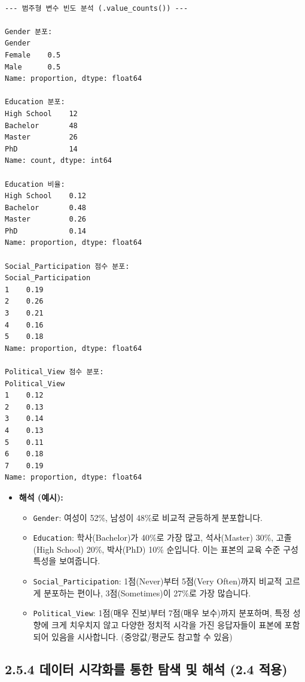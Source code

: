 \documentclass[
  letterpaper,
]{book}
\providecommand{\tightlist}{%
  \setlength{\itemsep}{0pt}\setlength{\parskip}{0pt}}
\begin{document}
\begin{verbatim}

--- 범주형 변수 빈도 분석 (.value_counts()) ---

Gender 분포:
Gender
Female    0.5
Male      0.5
Name: proportion, dtype: float64

Education 분포:
High School    12
Bachelor       48
Master         26
PhD            14
Name: count, dtype: int64

Education 비율:
High School    0.12
Bachelor       0.48
Master         0.26
PhD            0.14
Name: proportion, dtype: float64

Social_Participation 점수 분포:
Social_Participation
1    0.19
2    0.26
3    0.21
4    0.16
5    0.18
Name: proportion, dtype: float64

Political_View 점수 분포:
Political_View
1    0.12
2    0.13
3    0.14
4    0.13
5    0.11
6    0.18
7    0.19
Name: proportion, dtype: float64
\end{verbatim}

\begin{itemize}
\tightlist
\item
  \textbf{해석 (예시):}

  \begin{itemize}
  \tightlist
  \item
    \texttt{Gender}: 여성이 52\%, 남성이 48\%로 비교적 균등하게
    분포합니다.
  \item
    \texttt{Education}: 학사(Bachelor)가 40\%로 가장 많고, 석사(Master)
    30\%, 고졸(High School) 20\%, 박사(PhD) 10\% 순입니다. 이는 표본의
    교육 수준 구성 특성을 보여줍니다.
  \item
    \texttt{Social\_Participation}: 1점(Never)부터 5점(Very Often)까지
    비교적 고르게 분포하는 편이나, 3점(Sometimes)이 27\%로 가장
    많습니다.
  \item
    \texttt{Political\_View}: 1점(매우 진보)부터 7점(매우 보수)까지
    분포하며, 특정 성향에 크게 치우치지 않고 다양한 정치적 시각을 가진
    응답자들이 표본에 포함되어 있음을 시사합니다. (중앙값/평균도 참고할
    수 있음)
  \end{itemize}
\end{itemize}

\subsection{2.5.4 데이터 시각화를 통한 탐색 및 해석 (2.4
적용)}\label{uxb370uxc774uxd130-uxc2dcuxac01uxd654uxb97c-uxd1b5uxd55c-uxd0d0uxc0c9-uxbc0f-uxd574uxc11d-2.4-uxc801uxc6a9}
\end{document}
